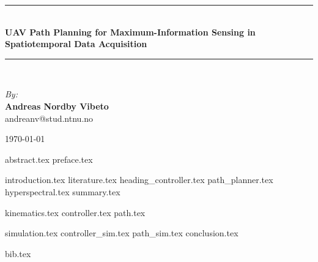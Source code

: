 \documentclass{article}
\newcommand{\HRule}{\rule{\linewidth}{0.5mm}}
\numberwithin{equation}{section}
\begin{document}
\begin{center}
\HRule \\[0.4cm]
{ \huge \bfseries UAV Path Planning for Maximum-Information Sensing in Spatiotemporal Data Acquisition}
\HRule \\[1.5cm]

\begin{center} \large
\emph{By:}\\
\textbf{Andreas Nordby Vibeto}\\
andreanv@stud.ntnu.no
\end{center}

\vfill

{\large \monthyear\today}

\end{center}
\newpage

{abstract.tex}
\newpage
{preface.tex}
\newpage

\tableofcontents

\newpage

\pagestyle{fancy}
{introduction.tex}
\newpage
{literature.tex}
{heading_controller.tex}
{path_planner.tex}
{hyperspectral.tex}
{summary.tex}

\newpage
{kinematics.tex}
\newpage
{controller.tex}
\newpage
{path.tex}
\newpage

{simulation.tex}
\newpage
{controller_sim.tex}
\newpage
{path_sim.tex}
\newpage
{conclusion.tex}

\newpage
{bib.tex}
\end{document}
